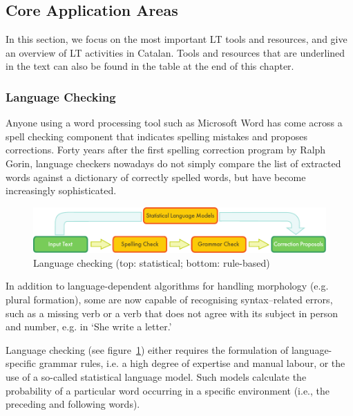 \documentclass[]{../../metanetpaper}
\begin{document}
\begin{multicols}{2}
\subsection{Core Application Areas}

    In this section, we focus on the most important LT tools and resources, and give an overview of LT activities in Catalan. Tools and resources that are underlined in the text can also be found in the table at the end of this chapter.

\subsubsection{Language Checking}

Anyone using a word processing tool such as Microsoft Word has come across a spell checking component that indicates spelling mistakes and proposes corrections. Forty years after the first spelling correction program by Ralph Gorin, language checkers nowadays do not simply compare the list of extracted words against a dictionary of correctly spelled words, but have become increasingly sophisticated. 

\begin{figure}[htb]
  \center
  \includegraphics[width=\textwidth]{../_media/english/language_checking}
  \caption{Language checking (top: statistical; bottom: rule-based)}
  \label{fig:langcheckingaarch_en}
\end{figure}

In addition to language-dependent algorithms for handling morphology (e.g. plural formation), some are now capable of recognising syntax–related errors, such as a missing verb or a verb that does not agree with its subject in person and number, e.g. in ‘She write a letter.’ 

Language checking (see figure~\ref{fig:langcheckingaarch_en}) either requires the formulation of language-specific grammar rules, i.e. a high degree of expertise and manual labour, or the use of a so-called statistical language model. Such models calculate the probability of a particular word occurring in a specific environment (i.e., the preceding and following words).


\end{multicols}
\end{document}
